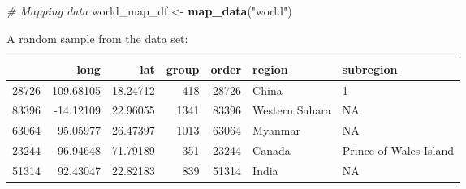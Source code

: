 \documentclass[]{book}
\newenvironment{Shaded}{\begin{snugshade}}{\end{snugshade}}
\newcommand{\KeywordTok}[1]{\textcolor[rgb]{0.13,0.29,0.53}{\textbf{#1}}}
\newcommand{\StringTok}[1]{\textcolor[rgb]{0.31,0.60,0.02}{#1}}
\newcommand{\CommentTok}[1]{\textcolor[rgb]{0.56,0.35,0.01}{\textit{#1}}}
\newcommand{\NormalTok}[1]{#1}
\theoremstyle{definition}
\theoremstyle{definition}
\theoremstyle{definition}
\theoremstyle{remark}
\begin{document}
\begin{Shaded}
\begin{Highlighting}[]
\CommentTok{# Mapping data}
\NormalTok{world_map_df <-}\StringTok{ }\KeywordTok{map_data}\NormalTok{(}\StringTok{"world"}\NormalTok{)}
\end{Highlighting}
\end{Shaded}

A random sample from the data set:

\begin{tabular}{l|r|r|r|r|l|l}
\hline
  & long & lat & group & order & region & subregion\\
\hline
28726 & 109.68105 & 18.24712 & 418 & 28726 & China & 1\\
\hline
83396 & -14.12109 & 22.96055 & 1341 & 83396 & Western Sahara & NA\\
\hline
63064 & 95.05977 & 26.47397 & 1013 & 63064 & Myanmar & NA\\
\hline
23244 & -96.94648 & 71.79189 & 351 & 23244 & Canada & Prince of Wales Island\\
\hline
51314 & 92.43047 & 22.82183 & 839 & 51314 & India & NA\\
\hline
\end{tabular}
\end{document}
